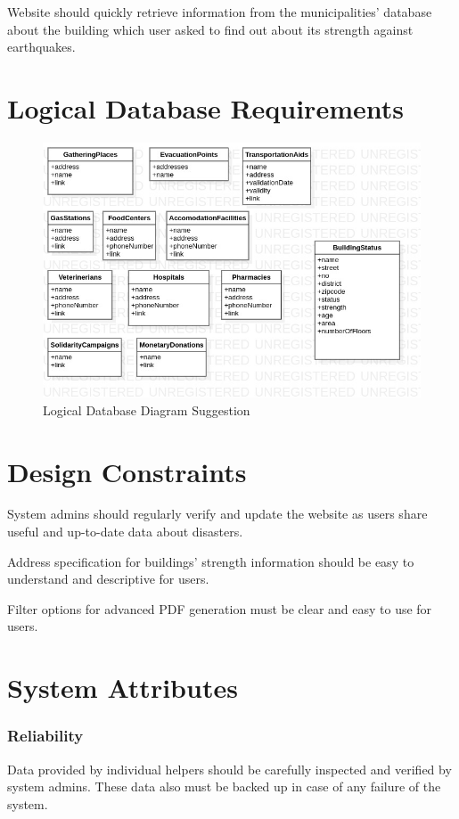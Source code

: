 \documentclass[12pt]{report}
\begin{document}
Website should quickly retrieve information from the municipalities' database about the building which user asked to find out about its strength against earthquakes.

\section{Logical Database Requirements}
\begin{figure}[H]
    \includegraphics[scale=0.5]{db2}
    \centering
    \caption{Logical Database Diagram Suggestion}
\end{figure}

\section{Design Constraints}
System admins should regularly verify and update the website as users share useful and up-to-date data about disasters.

Address specification for buildings' strength information should be easy to understand and descriptive for users.

Filter options for advanced PDF generation must be clear and easy to use for users.


\section{System Attributes}

\subsubsection{Reliability}
Data provided by individual helpers should be carefully inspected and verified by system admins. These data also must be backed up in case of any failure of the system.
\end{document}
